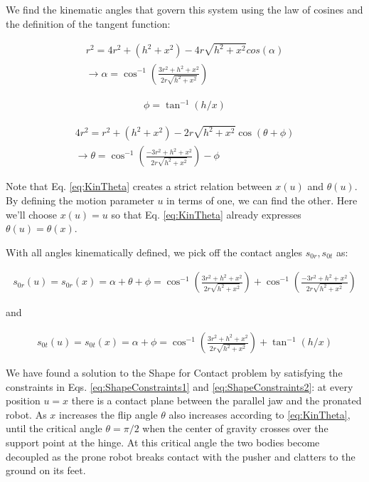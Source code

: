 \documentclass[letterpaper]{report}
\begin{document}
We find the kinematic angles that govern this system using the law of cosines and the definition of the tangent function:

\begin{align}
  r^2 = 4 r^2 + (h^2 + x^2) - 4r \sqrt{h^2 + x^2} cos(\alpha) \\
  \rightarrow \alpha = \cos^{-1} \left( \frac{3r^2 + h^2 + x^2}{2r \sqrt{h^2 + x^2}} \right)
\end{align}

\begin{align}
  \phi = \tan^{-1}(h/x)
\end{align}

\begin{align}
  4 r^2 = r^2 + (h^2 + x^2) - 2r \sqrt{h^2 + x^2} \cos(\theta + \phi) \\
  \rightarrow \theta = \cos^{-1} \left( \frac{-3r^2 + h^2 + x^2}{2r \sqrt{h^2 + x^2}} \right) - \phi \label{eq:KinTheta}
\end{align}

Note that Eq. \ref{eq:KinTheta} creates a strict relation between $x(u)$ and $\theta(u)$.
By defining the motion parameter $u$ in terms of one, we can find the other.
Here we'll choose $x(u) = u$ so that Eq. \ref{eq:KinTheta} already expresses $\theta(u) = \theta(x)$.

With all angles kinematically defined, we pick off the contact angles $s_{0r}, s_{0t}$ as:

\begin{align}
  s_{0r}(u) = s_{0r}(x) = \alpha + \theta + \phi = \cos^{-1} \left( \frac{3r^2 + h^2 + x^2}{2r \sqrt{h^2 + x^2}} \right) + \cos^{-1} \left( \frac{-3r^2 + h^2 + x^2}{2r \sqrt{h^2 + x^2}} \right)
\end{align}

and

\begin{align}
  s_{0t}(u) = s_{0t}(x) = \alpha + \phi = \cos^{-1} \left( \frac{3r^2 + h^2 + x^2}{2r \sqrt{h^2 + x^2}} \right) + \tan^{-1}(h/x)
\end{align}

We have found a solution to the Shape for Contact problem by satisfying the constraints in Eqs. \ref{eq:ShapeConstraints1} and \ref{eq:ShapeConstraints2}: at every position $u = x$ there is a contact plane between the parallel jaw and the pronated robot.
As $x$ increases the flip angle $\theta$ also increases according to \ref{eq:KinTheta}, until the critical angle $\theta = \pi/2$ when the center of gravity crosses over the support point at the hinge.
At this critical angle the two bodies become decoupled as the prone robot breaks contact with the pusher and clatters to the ground on its feet.
\end{document}
